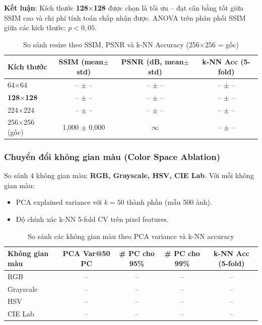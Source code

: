 \documentclass[12pt,a4paper]{article}
\let\oldtextbf\textbf
\renewcommand{\textbf}[1]{\oldtextbf{\textcolor{hcmublue}{#1}}}
\begin{document}
\textbf{Kết luận}: Kích thước \textbf{128$\times$128} được chọn là tối ưu -- đạt cân bằng tốt giữa SSIM cao và chi phí tính toán chấp nhận được. ANOVA trên phân phối SSIM giữa các kích thước: $p < 0{,}05$.

\begin{table}[H]
\centering
\begin{tabular}{|l|c|c|c|}
\hline
\textbf{Kích thước} & \textbf{SSIM (mean$\pm$std)} & \textbf{PSNR (dB, mean$\pm$std)} & \textbf{k-NN Acc (5-fold)} \\ \hline
64$\times$64   & -- $\pm$ -- & -- $\pm$ -- & -- $\pm$ -- \\ \hline
\textbf{128$\times$128} & -- $\pm$ -- & -- $\pm$ -- & -- $\pm$ -- \\ \hline
224$\times$224 & -- $\pm$ -- & -- $\pm$ -- & -- $\pm$ -- \\ \hline
256$\times$256 (gốc) & 1,000 $\pm$ 0,000 & $\infty$ & -- $\pm$ -- \\ \hline
\end{tabular}
\caption{So sánh resize theo SSIM, PSNR và k-NN Accuracy (256$\times$256 = gốc)}
\label{tab:resize_ablation}
\end{table}

\subsubsection{Chuyển đổi không gian màu (Color Space Ablation)}

So sánh 4 không gian màu: \textbf{RGB, Grayscale, HSV, CIE Lab}. Với mỗi không gian màu:
\begin{itemize}
    \item PCA explained variance với $k = 50$ thành phần (mẫu 500 ảnh).
    \item Độ chính xác k-NN 5-fold CV trên pixel features.
\end{itemize}

\begin{table}[H]
\centering
\begin{tabular}{|l|c|c|c|c|}
\hline
\textbf{Không gian màu} & \textbf{PCA Var@50 PC} & \textbf{\# PC cho 95\%} & \textbf{\# PC cho 99\%} & \textbf{k-NN Acc (5-fold)} \\ \hline
RGB       & -- & -- & -- & -- \\ \hline
Grayscale & -- & -- & -- & -- \\ \hline
HSV       & -- & -- & -- & -- \\ \hline
CIE Lab   & -- & -- & -- & -- \\ \hline
\end{tabular}
\caption{So sánh các không gian màu theo PCA variance và k-NN accuracy}
\label{tab:colorspace}
\end{table}
\end{document}
